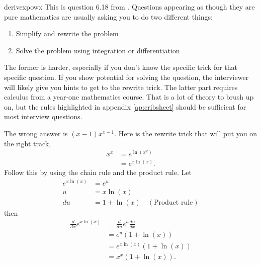 \begin{answer}{derivexpowx}
This is question 6.18 from \citet{JoshiQA}.
Questions appearing as though they are pure mathematics are usually asking you to do two different things:
\begin{enumerate}
  \item Simplify and rewrite the problem
  \item Solve the problem using integration or differentiation
\end{enumerate}
The former is harder, especially if you don't know the specific trick for that specific question.
If you show potential for solving the question, the interviewer will likely give you hints to get to the rewrite trick.
The latter part requires calculus from a year-one mathematics course.
That is a lot of theory to brush up on, but the rules highlighted in appendix \ref{ap:cribsheet} should be sufficient for most interview questions.

The wrong answer is $(x-1) x^{x-1}$.
Here is the rewrite trick that will put you on the right track,
\begin{align*}
  x^x &= e^{ \ln(x^x )} \\
      &= e^{x \ln(x )}
      \text{.}
\end{align*}
Follow this by using the chain rule and the product rule. Let
\begin{align*}
      e^{x \ln(x )} &=  e^{u} \\
      u &= x \ln(x) \\
     du &= 1 + \ln(x) \quad (\text{Product rule})
\end{align*}
then
\begin{align*}
\frac{d}{dx} e^{x \ln(x )} &= \frac{d}{du} e^{u}  \frac{du}{dx} \\
                           &=  e^{u} (1 + \ln(x)) \\
                           &=  e^{x \ln(x)} (1 + \ln(x)) \\
                           &=  x^x (1 + \ln(x))
\text{.}
\end{align*}
\end{answer}
